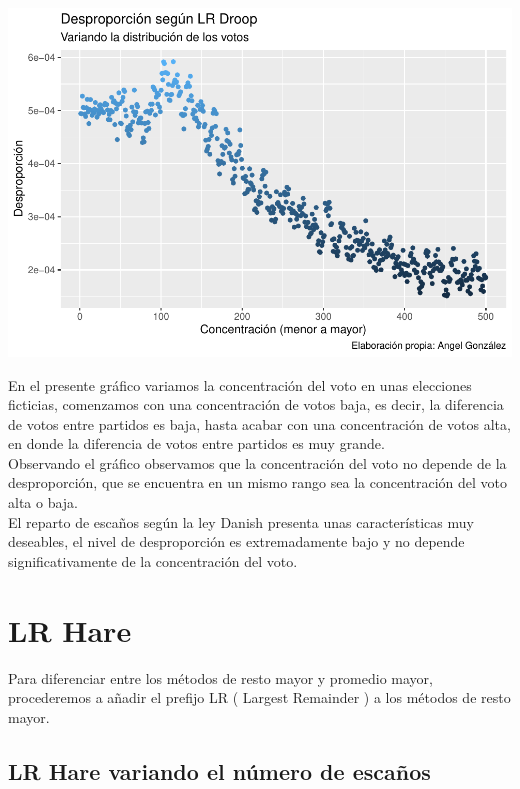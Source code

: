 \documentclass[12pt,a4paper,]{book}
\newenvironment{Shaded}{\begin{snugshade}}{\end{snugshade}}
\newcommand{\FunctionTok}[1]{\textcolor[rgb]{0.00,0.00,0.00}{#1}}
\newcommand{\NormalTok}[1]{#1}
\numberwithin{dummy}{section}
\theoremstyle{ocrenumbox}
\theoremstyle{blacknumex}
\theoremstyle{blacknumbox}
\theoremstyle{ocrenum}
\theoremstyle{ocrenum}
\begin{document}
\begin{center}\includegraphics[width=0.95\linewidth]{figurasR/unnamed-chunk-48-1} \end{center}

En el presente gráfico variamos la concentración del voto en unas
elecciones ficticias, comenzamos con una concentración de votos baja, es
decir, la diferencia de votos entre partidos es baja, hasta acabar con
una concentración de votos alta, en donde la diferencia de votos entre
partidos es muy grande.\\
Observando el gráfico observamos que la concentración del voto no
depende de la desproporción, que se encuentra en un mismo rango sea la
concentración del voto alta o baja.\\
El reparto de escaños según la ley Danish presenta unas características
muy deseables, el nivel de desproporción es extremadamente bajo y no
depende significativamente de la concentración del voto.

\hypertarget{lr-hare}{%
\section{LR Hare}\label{lr-hare}}

\begin{Shaded}
\begin{Highlighting}[]
\NormalTok{Para diferenciar entre los métodos de resto mayor y promedio mayor, }
\NormalTok{procederemos a añadir el prefijo }\FunctionTok{LR}\NormalTok{ ( Largest Remainder ) }
\NormalTok{a los métodos de resto mayor.}
\end{Highlighting}
\end{Shaded}

\hypertarget{lr-hare-variando-el-nuxfamero-de-escauxf1os}{%
\subsection{LR Hare variando el número de
escaños}\label{lr-hare-variando-el-nuxfamero-de-escauxf1os}}
\end{document}

